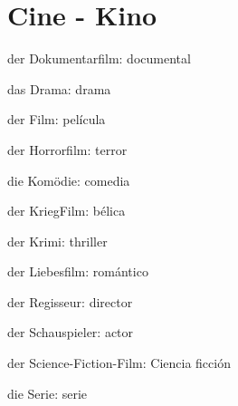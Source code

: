 \section{Cine - Kino}
\begin{multicols}{2}
\begin{myitemize}
\item der Dokumentarfilm: documental
\item das Drama: drama
\item der Film: película
\item der Horrorfilm: terror
\item die Komödie: comedia
\item der KriegFilm: bélica
\item der Krimi: thriller
\item der Liebesfilm: romántico
\item der Regisseur: director
\item der Schauspieler: actor
\item der Science-Fiction-Film: Ciencia ficción
\item die Serie: serie
\end{myitemize}
\end{multicols}

